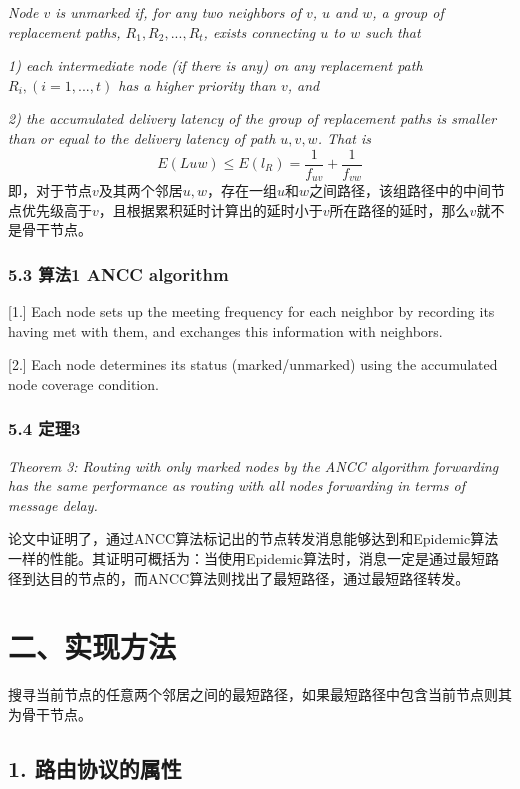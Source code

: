 \documentclass[lang=cn,11pt]{elegantpaper}
\begin{document}
	\emph{Node $v$ is unmarked if, for any two neighbors of $v$, $u$ and $w$, a group of replacement paths, $R_1, R_2,...,R_t$, exists connecting $u$ to $w$ such that}
	
	\emph{1) each intermediate node (if there is any) on any replacement path $R_i,(i = 1,...,t)$ has a higher priority than $v$, and}
	
	\emph{2) the accumulated delivery latency of the group of replacement paths is smaller than or equal to the delivery latency of path $u, v, w$. That is}
	$$
	E(L{uw})\le E(l_R)=\frac{1}{f_{uv}}+\frac{1}{f_{vw}}
	$$
	即，对于节点$v$及其两个邻居$u,w$，存在一组$u$和$w$之间路径，该组路径中的中间节点优先级高于$v$，且根据累积延时计算出的延时小于$v$所在路径的延时，那么$v$就不是骨干节点。
	
	\subsubsection*{5.3 算法1 ANCC algorithm}
	
	[1.] Each node sets up the meeting frequency for each neighbor by recording its having met with them, and exchanges this information with neighbors. 
	
	[2.] Each node determines its status (marked/unmarked) using the accumulated node coverage condition.
	
	\subsubsection*{5.4 定理3}
	
	\emph{Theorem 3: Routing with only marked nodes by the ANCC algorithm forwarding has the same performance as routing with all nodes forwarding in terms of message delay.}
	
	论文中证明了，通过ANCC算法标记出的节点转发消息能够达到和Epidemic算法一样的性能。其证明可概括为：当使用Epidemic算法时，消息一定是通过最短路径到达目的节点的，而ANCC算法则找出了最短路径，通过最短路径转发。


\section*{二、实现方法}

搜寻当前节点的任意两个邻居之间的最短路径，如果最短路径中包含当前节点则其为骨干节点。
	
	\subsection*{1. 路由协议的属性}
	
\end{document}
